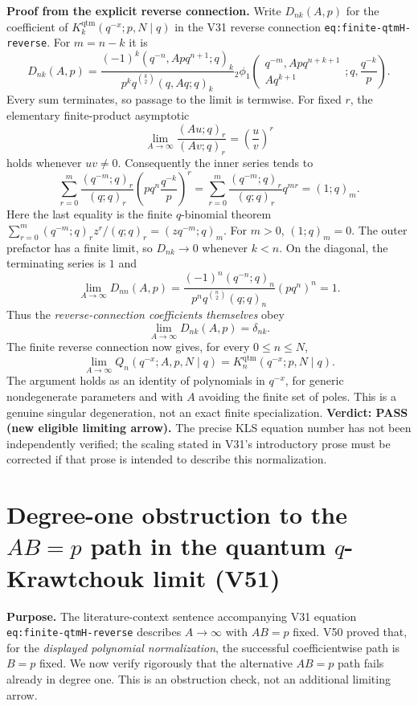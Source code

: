 \documentclass[11pt]{article}
\begin{document}
\noindent\textbf{Proof from the explicit reverse connection.}
Write $D_{nk}(A,p)$ for the coefficient of
$K_k^{\mathrm{qtm}}(q^{-x};p,N\mid q)$ in the V31 reverse
connection \texttt{eq:finite-qtmH-reverse}. For $m=n-k$ it is
\[
 D_{nk}(A,p)=
 \frac{(-1)^k(q^{-n},Apq^{n+1};q)_k}
 {p^kq^{\binom{k}{2}}(q,Aq;q)_k}
 {}_2\phi_1\!\left(\begin{matrix}q^{-m},Apq^{n+k+1}\\
 Aq^{k+1}\end{matrix};q,\frac{q^{-k}}p\right).
\]
Every sum terminates, so passage to the limit is termwise. For fixed
$r$, the elementary finite-product asymptotic
\[
 \lim_{A\to\infty}\frac{(Au;q)_r}{(Av;q)_r}
 =\left(\frac uv\right)^r
\]
holds whenever $uv\ne0$. Consequently the inner series tends to
\[
 \sum_{r=0}^{m}\frac{(q^{-m};q)_r}{(q;q)_r}
 \left(pq^n\frac{q^{-k}}p\right)^r
 =\sum_{r=0}^{m}\frac{(q^{-m};q)_r}{(q;q)_r}q^{mr}
 =(1;q)_m.
\]
Here the last equality is the finite $q$-binomial theorem
$\sum_{r=0}^m(q^{-m};q)_r z^r/(q;q)_r=(zq^{-m};q)_m$.
For $m>0$, $(1;q)_m=0$. The outer prefactor has a finite limit,
so $D_{nk}\to0$ whenever $k<n$. On the diagonal, the terminating
series is $1$ and
\[
 \lim_{A\to\infty}D_{nn}(A,p)
 =\frac{(-1)^n(q^{-n};q)_n}{p^nq^{\binom n2}(q;q)_n}
 \left(pq^n\right)^n=1.
\]
Thus the \emph{reverse-connection coefficients themselves} obey
\[
 \boxed{\lim_{A\to\infty}D_{nk}(A,p)=\delta_{nk}.}
\]
The finite reverse connection now gives, for every $0\le n\le N$,
\[
 \boxed{\lim_{A\to\infty}Q_n(q^{-x};A,p,N\mid q)
 =K_n^{\mathrm{qtm}}(q^{-x};p,N\mid q).}
\]
The argument holds as an identity of polynomials in $q^{-x}$,
for generic nondegenerate parameters and with $A$ avoiding the finite
set of poles. This is a genuine singular degeneration, not an exact
finite specialization. \textbf{Verdict: PASS (new eligible limiting arrow).}
The precise KLS equation number has not been independently verified;
the scaling stated in V31's introductory prose must be corrected if
that prose is intended to describe this normalization.


\section{Degree-one obstruction to the $AB=p$ path in the quantum $q$-Krawtchouk limit (V51)}
\noindent\textbf{Purpose.} The literature-context sentence accompanying V31 equation
\texttt{eq:finite-qtmH-reverse} describes $A\to\infty$ with $AB=p$
fixed. V50 proved that, for the \emph{displayed polynomial normalization},
the successful coefficientwise path is $B=p$ fixed. We now verify
rigorously that the alternative $AB=p$ path fails already in degree one.
This is an obstruction check, not an additional limiting arrow.
\end{document}
